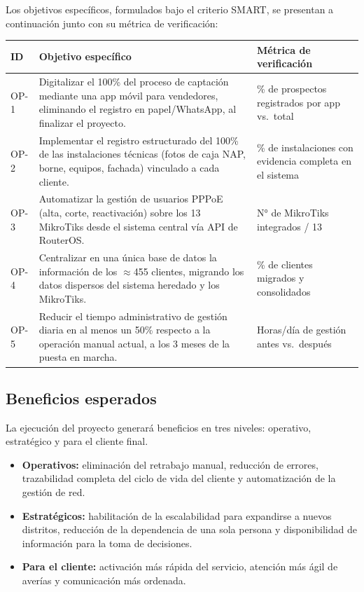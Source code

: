 Los objetivos específicos, formulados bajo el criterio SMART, se presentan a
continuación junto con su métrica de verificación:

\begin{center}
\label{tab:objetivos-smart}
\begin{tabularx}{\textwidth}{C{1.1cm} X X}
\toprule
\textbf{ID} & \textbf{Objetivo específico} & \textbf{Métrica de verificación} \\
\midrule
OP-1 &
Digitalizar el 100\% del proceso de captación mediante una app móvil para
vendedores, eliminando el registro en papel/WhatsApp, al finalizar el proyecto. &
\% de prospectos registrados por app vs.\ total \\
OP-2 &
Implementar el registro estructurado del 100\% de las instalaciones técnicas
(fotos de caja NAP, borne, equipos, fachada) vinculado a cada cliente. &
\% de instalaciones con evidencia completa en el sistema \\
OP-3 &
Automatizar la gestión de usuarios PPPoE (alta, corte, reactivación) sobre los 13
MikroTiks desde el sistema central vía API de RouterOS. &
N° de MikroTiks integrados / 13 \\
OP-4 &
Centralizar en una única base de datos la información de los $\approx$455 clientes,
migrando los datos dispersos del sistema heredado y los MikroTiks. &
\% de clientes migrados y consolidados \\
OP-5 &
Reducir el tiempo administrativo de gestión diaria en al menos un 50\% respecto a la
operación manual actual, a los 3 meses de la puesta en marcha. &
Horas/día de gestión antes vs.\ después \\
\bottomrule
\end{tabularx}
\end{center}

\subsection{Beneficios esperados}

La ejecución del proyecto generará beneficios en tres niveles: operativo,
estratégico y para el cliente final.

\begin{itemize}[leftmargin=1.4em]
  \item \textbf{Operativos:} eliminación del retrabajo manual, reducción de errores,
  trazabilidad completa del ciclo de vida del cliente y automatización de la gestión
  de red.
  \item \textbf{Estratégicos:} habilitación de la escalabilidad para expandirse a
  nuevos distritos, reducción de la dependencia de una sola persona y disponibilidad
  de información para la toma de decisiones.
  \item \textbf{Para el cliente:} activación más rápida del servicio, atención más
  ágil de averías y comunicación más ordenada.
\end{itemize}

